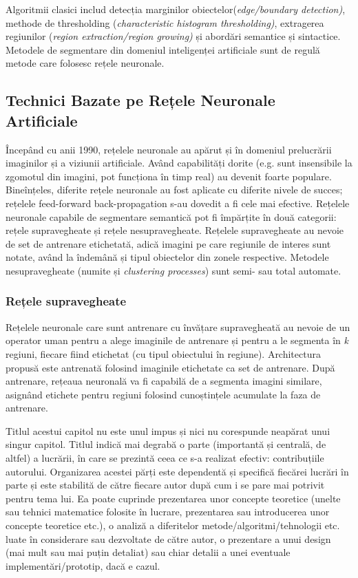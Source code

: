 Algoritmii clasici includ detecția marginilor obiectelor(\textit{edge/boundary detection)}, methode de thresholding (\textit{characteristic histogram thresholding)}, extragerea regiunilor (\textit{region extraction/region growing)} și abordări semantice și sintactice.\newline
Metodele de segmentare din domeniul inteligenței artificiale sunt de regulă metode care folosesc rețele neuronale.\newline

\subsection{Technici Bazate pe Rețele Neuronale Artificiale}
Începând cu anii 1990, rețelele neuronale au apărut și în domeniul prelucrării imaginilor și a viziunii artificiale. Având capabilități dorite (e.g. sunt insensibile la zgomotul din imagini, pot funcționa în timp real) au devenit foarte populare. Bineînțeles, diferite rețele neuronale au fost aplicate cu diferite nivele de succes; rețelele feed-forward back-propagation s-au dovedit a fi cele mai efective.\newline
Rețelele neuronale capabile de segmentare semantică pot fi împărțite în două categorii: rețele supravegheate și rețele nesupravegheate. Rețelele supravegheate au nevoie de set de antrenare etichetată, adică imagini pe care regiunile de interes sunt notate, având la îndemână și tipul obiectelor din zonele respective. Metodele nesupravegheate (numite și \textit{clustering processes}) sunt semi- sau total automate.

\subsubsection{Rețele supravegheate}
Rețelele neuronale care sunt antrenare cu învățare supravegheată au nevoie de un operator uman pentru a alege imaginile de antrenare și pentru a le segmenta în \textit{k} regiuni, fiecare fiind etichetat (cu tipul obiectului în regiune). Architectura propusă este antrenată folosind imaginile etichetate ca set de antrenare. După antrenare, rețeaua neuronală va fi capabilă de a segmenta imagini similare, asignând etichete pentru regiuni folosind cunoștințele acumulate la faza de antrenare.



Titlul acestui capitol nu este unul impus și nici nu corespunde neapărat unui singur capitol. Titlul indică mai degrabă o parte (importantă și centrală, de altfel) a lucrării, în care se prezintă ceea ce s-a realizat efectiv: contribuțiile autorului. Organizarea acestei părți este dependentă și specifică fiecărei lucrări în parte și este stabilită de către fiecare autor după cum i se pare mai potrivit pentru tema lui. Ea poate cuprinde prezentarea unor concepte teoretice (unelte sau tehnici matematice folosite în lucrare, prezentarea sau introducerea unor concepte teoretice etc.), o analiză a diferitelor metode/algoritmi/tehnologii etc. luate în considerare sau dezvoltate de către autor, o prezentare a unui design (mai mult sau mai puțin detaliat) sau chiar detalii a unei eventuale implementări/prototip, dacă e cazul.

